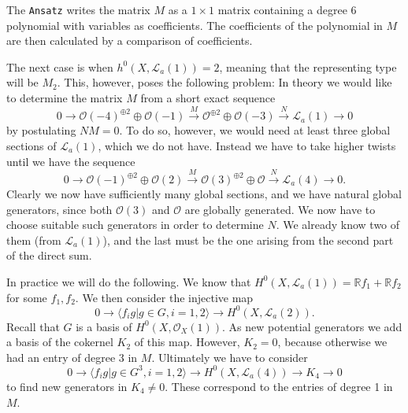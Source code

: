 \documentclass[a4paper,10pt]{amsart}
\theoremstyle{definition}
\theoremstyle{plain}
\newcommand{\cL}{{\mathcal L}}
\newcommand{\cO}{{\mathcal O}}
\newcommand{\R}{{\mathbb R}}
\begin{document}
The \texttt{Ansatz} writes the matrix $M$ as a $1 \times 1$ matrix containing a degree 6 polynomial with variables as coefficients. The coefficients of the polynomial in $M$ are then calculated by a comparison of coefficients.

The next case is when $h^0(X, \cL_a(1)) = 2$, meaning that the representing type will be $M_2$. This, however, poses the following problem: In theory we would like to determine the matrix $M$ from a short exact sequence
\begin{equation*}
    0 \to \cO(-4)^{\oplus2} \oplus \cO(-1) \overset{M}{\to} \cO^{\oplus2} \oplus \cO(-3) \overset{N}{\to} \cL_a(1) \to 0
\end{equation*}
by postulating $NM = 0$. To do so, however, we would need at least three global sections of $\cL_a(1)$, which we do not have. Instead we have to take higher twists until we have the sequence
\begin{equation*}
    0 \to \cO(-1)^{\oplus2} \oplus \cO(2) \overset{M}{\to} \cO(3)^{\oplus2} \oplus \cO \overset{N}{\to} \cL_a(4) \to 0.
\end{equation*}
Clearly we now have sufficiently many global sections, and we have natural global generators, since both $\cO(3)$ and $\cO$ are globally generated. We now have to choose suitable such generators in order to determine $N$. We already know two of them (from $\cL_a(1)$), and the last must be the one arising from the second part of the direct sum.

In practice we will do the following. We know that $H^0(X, \cL_a(1)) = \R f_1 + \R f_2$ for some $f_1, f_2$. We then consider the injective map
\begin{equation*}
    0 \to \langle f_i g | g \in G, i = 1,2 \rangle \to H^0(X, \cL_a(2)).
\end{equation*}
Recall that $G$ is a basis of $H^0(X, \cO_X(1))$. As new potential generators we add a basis of the cokernel $K_2$ of this map. However, $K_2 = 0$, because otherwise we had an entry of degree 3 in $M$. Ultimately we have to consider
\begin{equation*}
    0 \to \langle f_i g | g \in G^3, i = 1,2 \rangle \to H^0(X, \cL_a(4)) \to K_4 \to 0
\end{equation*}
to find new generators in $K_4 \neq 0$. These correspond to the entries of degree 1 in $M$.
\end{document}
